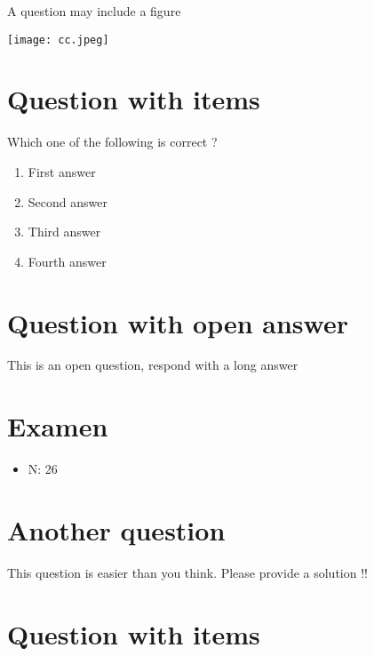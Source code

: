 \documentclass[a4paper,11pt,twoside]{article}
\begin{document}
A question may include a figure

\begin{center}
\texttt{[image: cc.jpeg]}
\end{center}



\section*{Question with items}
\label{sec:org92c716f}

Which one of the following is correct ?

\begin{enumerate}
\item First answer
\item Second answer
\item Third answer
\item Fourth answer
\end{enumerate}



\section*{Question with open answer}
\label{sec:org8f317ae}

This is an open question, respond with a long answer


\subsection*{}
\label{sec:org6b65c15}

\cleardoublepage

\section*{Examen}
\label{sec:orge7779e1}
\begin{itemize}
\item N: 26
\end{itemize}
\section*{Another question}
\label{sec:org7b7d3e4}

This question is easier than you think. Please provide a solution !!



\section*{Question with items}
\label{sec:orgab908da}
\end{document}

